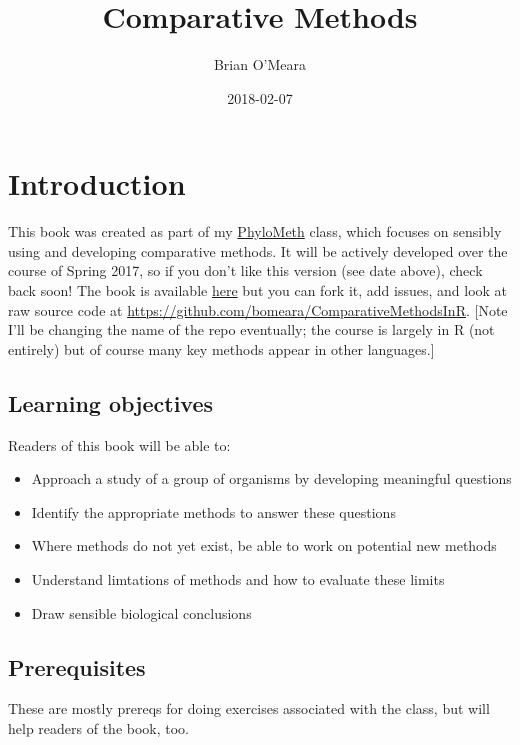 \documentclass[]{article}
\title{Comparative Methods}
\author{Brian O'Meara}
\date{2018-02-07}
\providecommand{\tightlist}{%
  \setlength{\itemsep}{0pt}\setlength{\parskip}{0pt}}
\theoremstyle{definition}
\theoremstyle{definition}
\theoremstyle{definition}
\theoremstyle{remark}
\begin{document}
\maketitle

{
\setcounter{tocdepth}{2}
\tableofcontents
}
\hypertarget{introduction}{%
\section{Introduction}\label{introduction}}

This book was created as part of my
\href{http://www.phylometh.org}{PhyloMeth} class, which focuses on
sensibly using and developing comparative methods. It will be actively
developed over the course of Spring 2017, so if you don't like this
version (see date above), check back soon! The book is available
\href{https://bookdown.org/bomeara/comparative-methods/}{here} but you
can fork it, add issues, and look at raw source code at
\url{https://github.com/bomeara/ComparativeMethodsInR}. {[}Note I'll be
changing the name of the repo eventually; the course is largely in R
(not entirely) but of course many key methods appear in other
languages.{]}

\hypertarget{learning-objectives}{%
\subsection{Learning objectives}\label{learning-objectives}}

Readers of this book will be able to:

\begin{itemize}
\tightlist
\item
  Approach a study of a group of organisms by developing meaningful
  questions
\item
  Identify the appropriate methods to answer these questions
\item
  Where methods do not yet exist, be able to work on potential new
  methods
\item
  Understand limtations of methods and how to evaluate these limits
\item
  Draw sensible biological conclusions
\end{itemize}

\hypertarget{prerequisites}{%
\subsection{Prerequisites}\label{prerequisites}}

These are mostly prereqs for doing exercises associated with the class,
but will help readers of the book, too.
\end{document}
